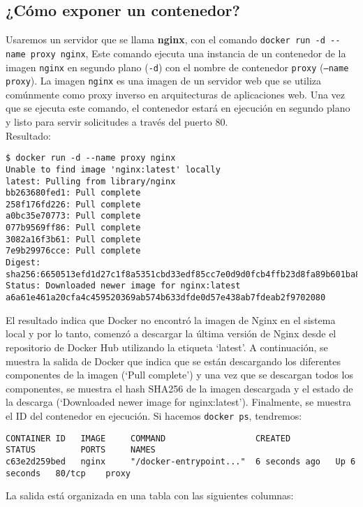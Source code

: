 \documentclass{article}
\begin{document}
\subsection{¿Cómo exponer un contenedor?}
Usaremos un servidor que se llama \textbf{nginx}, con el comando \lstinline{docker run -d --name proxy nginx}, Este comando ejecuta una instancia de un contenedor de la imagen \texttt{nginx} en segundo plano (\texttt{-d}) con el nombre de contenedor \texttt{proxy} (\texttt{--name proxy}). La imagen \texttt{nginx} es una imagen de un servidor web que se utiliza comúnmente como proxy inverso en arquitecturas de aplicaciones web. Una vez que se ejecuta este comando, el contenedor estará en ejecución en segundo plano y listo para servir solicitudes a través del puerto 80.\\
Resultado:
\begin{lstlisting}[numbers=none]
$ docker run -d --name proxy nginx
Unable to find image 'nginx:latest' locally
latest: Pulling from library/nginx
bb263680fed1: Pull complete 
258f176fd226: Pull complete 
a0bc35e70773: Pull complete 
077b9569ff86: Pull complete 
3082a16f3b61: Pull complete 
7e9b29976cce: Pull complete 
Digest: sha256:6650513efd1d27c1f8a5351cbd33edf85cc7e0d9d0fcb4ffb23d8fa89b601ba8
Status: Downloaded newer image for nginx:latest
a6a61e461a20cfa4c459520369ab574b633dfde0d57e438ab7fdeab2f9702080           
\end{lstlisting}
El resultado indica que Docker no encontró la imagen de Nginx en el sistema local y por lo tanto, comenzó a descargar la última versión de Nginx desde el repositorio de Docker Hub utilizando la etiqueta \enquote*{latest}. A continuación, se muestra la salida de Docker que indica que se están descargando los diferentes componentes de la imagen (\enquote*{Pull complete}) y una vez que se descargan todos los componentes, se muestra el hash SHA256 de la imagen descargada y el estado de la descarga (\enquote*{Downloaded newer image for nginx:latest}). Finalmente, se muestra el ID del contenedor en ejecución.
Si hacemos \lstinline{docker ps}, tendremos:
\begin{lstlisting}[numbers=none]
CONTAINER ID   IMAGE     COMMAND                  CREATED         STATUS         PORTS     NAMES
c63e2d259bed   nginx     "/docker-entrypoint..."  6 seconds ago   Up 6 seconds   80/tcp    proxy      
\end{lstlisting}
La salida está organizada en una tabla con las siguientes columnas:
\end{document}
